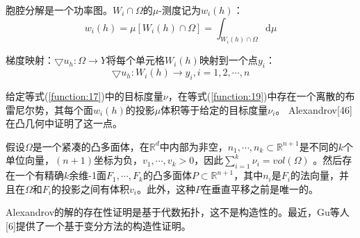 胞腔分解是一个功率图。$W_i \cap \Omega$的$\mu$-测度记为$w_i(h)$：
\begin{equation}
	w_i(h)=\mu\left [ W_i(h) \cap \Omega \right ] = \int _{W_i(h) \cap \Omega}\mathrm{d}\mu  
	\label{function:21}
\end{equation}

梯度映射：$\bigtriangledown u_h : \Omega \to Y$将每个单元格$W_i(h)$映射到一个点$y_i$：
\begin{equation}
	\bigtriangledown u_h : W_i(h) \to y_i, i=1,2, \cdots ,n 
	\label{function:22}
\end{equation}

给定等式(\ref{function:17})中的目标度量$\nu$，在等式(\ref{function:19})中存在一个离散的布雷尼尔势，其每个面$w_i(h)$的投影$\mu$体积等于给定的目标度量$\nu _i$。 Alexandrov[46]在凸几何中证明了这一点。
\begin{theorem}[Alexandrov【46】] \label{theorem:4.1}
	假设$\Omega$是一个紧凑的凸多面体，在$\mathbb{R}^d$中内部为非空，$n_1,\cdots, n_k \subset \mathbb{R}^{n+1}$是不同的$k$个单位向量，$(n+1)$坐标为负，$v_1,\cdots, v_k > 0$，因此$\sum_{i=1}^{k} \nu _i= vol(\Omega)$ 。然后存在一个有精确$k$余维-1面$F_1, \cdots ,F_k$的凸多面体$P \subset \mathbb{R}^{n+1}$，其中$n_i$是$F_i$的法向量，并且在$\Omega$和$F_i$的投影之间有体积$v_i$。此外，这种$P$在垂直平移之前是唯一的。
	
	Alexandrov的解的存在性证明是基于代数拓扑，这不是构造性的。最近，Gu等人[6]提供了一个基于变分方法的构造性证明。
\end{theorem}

